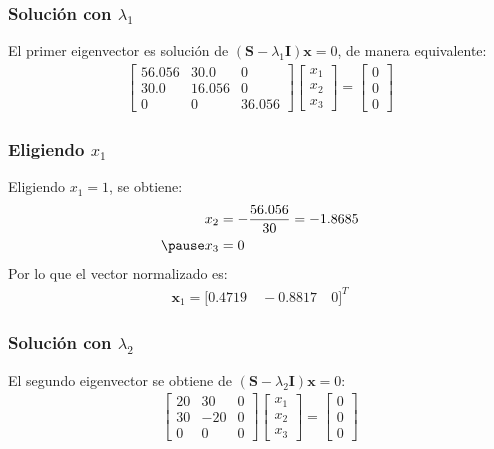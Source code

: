 \documentclass[12pt]{beamer}
\begin{document}
\begin{frame}
\frametitle{Solución con $\lambda_{1}$}
El primer eigenvector es solución de $(\mathbf{S} - \lambda_{1} \mathbf{I}) \mathbf{x} = 0$, de manera equivalente:
\pause
\begin{align*}
\begin{bmatrix}
56.056 & 30.0 & 0 \\
30.0 & 16.056 & 0 \\
0 & 0 & 36.056
\end{bmatrix}
\begin{bmatrix}
x_{1} \\
x_{2} \\
x_{3}
\end{bmatrix}
= \begin{bmatrix}
0 \\
0 \\
0
\end{bmatrix}
\end{align*}
\end{frame}
\begin{frame}
\frametitle{Eligiendo $x_{1}$}
Eligiendo $x_{1} = 1$, \pause se obtiene:
\pause
\begin{eqnarray*}
\begin{aligned}
x_{2} &= - \dfrac{56.056}{30} = - 1.8685 \\ \pause
x_{3} &= 0
\end{aligned}
\end{eqnarray*}
\pause
Por lo que el vector normalizado es:
\pause
\begin{align*}
\mathbf{x}_{1} = \big[ 0.4719 \quad -0.8817 \quad 0 \big]^{T}
\end{align*}
\end{frame}
\begin{frame}
\frametitle{Solución con $\lambda_{2}$}
El segundo eigenvector se obtiene de $(\mathbf{S} - \lambda_{2} \mathbf{I}) \mathbf{x} = 0$:
\pause
\begin{align*}
\begin{bmatrix}
20 & 30 & 0 \\
30 & -20 & 0 \\
0 & 0 & 0
\end{bmatrix}
\begin{bmatrix}
x_{1} \\
x_{2} \\
x_{3}
\end{bmatrix}
= \begin{bmatrix}
0 \\
0 \\
0
\end{bmatrix}
\end{align*}
\end{frame}
\end{document}
